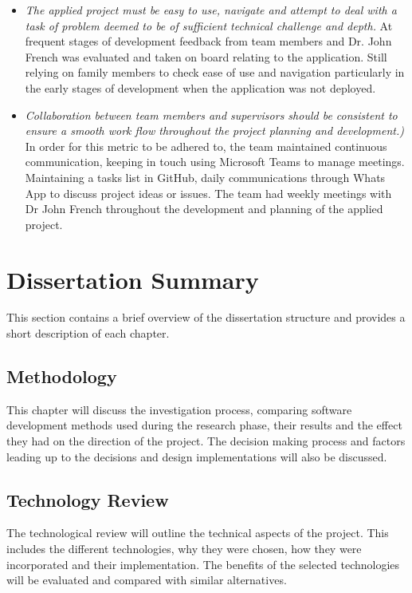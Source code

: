 \begin{itemize}

    \item \emph{The applied project must be easy to use, navigate and attempt to deal with a task of problem deemed to be of sufficient technical challenge and depth.} At frequent stages of development feedback from team members and Dr. John French was evaluated and taken on board relating to the application. Still relying on family members to check ease of use and navigation particularly in the early stages of development when the application was not deployed.

    \item \emph{Collaboration between team members and supervisors should be consistent to ensure a smooth work flow throughout the project planning and development.)} In order for this metric to be adhered to, the team maintained continuous communication, keeping in touch using Microsoft Teams to manage meetings. Maintaining a tasks list in GitHub, daily communications through Whats App to discuss project ideas or issues.
    The team had weekly meetings with Dr John French throughout the development and planning of the applied project.

\end{itemize}

\section{Dissertation Summary}
This section contains a brief overview of the dissertation structure and provides a short description of each chapter.

\subsection{Methodology}
This chapter will discuss the investigation process, comparing software development methods used during the research phase, their results and the effect they had on the direction of the project. The decision making process and factors leading up to the decisions and design implementations will also be discussed. 

\subsection{Technology Review}
The technological review will outline the technical aspects of the project. This includes the different technologies, why they were chosen, how they were incorporated and their implementation. The benefits of the selected technologies will be evaluated and compared with similar alternatives.

